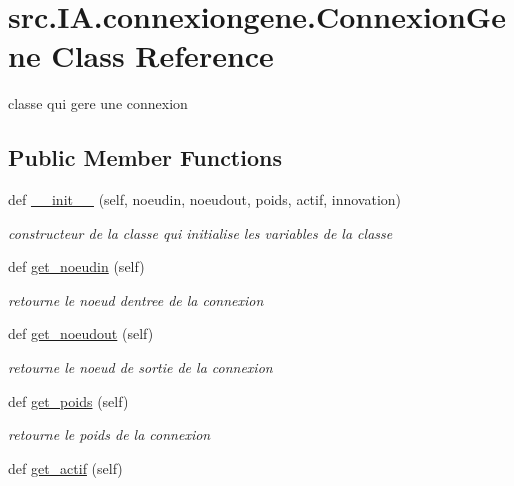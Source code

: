 \hypertarget{classsrc_1_1_i_a_1_1connexiongene_1_1_connexion_gene}{}\section{src.\+I\+A.\+connexiongene.\+Connexion\+Gene Class Reference}
\label{classsrc_1_1_i_a_1_1connexiongene_1_1_connexion_gene}


classe qui gere une connexion  


\subsection*{Public Member Functions}
\begin{DoxyCompactItemize}
\item 
def \hyperlink{classsrc_1_1_i_a_1_1connexiongene_1_1_connexion_gene_a7ec0e67af0142785e0094dee86c51bdd}{\+\_\+\+\_\+init\+\_\+\+\_\+} (self, noeudin, noeudout, poids, actif, innovation)
\begin{DoxyCompactList}\small\item\em constructeur de la classe qui initialise les variables de la classe \end{DoxyCompactList}\item 
def \hyperlink{classsrc_1_1_i_a_1_1connexiongene_1_1_connexion_gene_a9b9157543ead5133573d75d3c2f53058}{get\+\_\+noeudin} (self)
\begin{DoxyCompactList}\small\item\em retourne le noeud d\textquotesingle{}entree de la connexion \end{DoxyCompactList}\item 
def \hyperlink{classsrc_1_1_i_a_1_1connexiongene_1_1_connexion_gene_a4174ac5c3b9ec1eae9c68a03d809672f}{get\+\_\+noeudout} (self)
\begin{DoxyCompactList}\small\item\em retourne le noeud de sortie de la connexion \end{DoxyCompactList}\item 
def \hyperlink{classsrc_1_1_i_a_1_1connexiongene_1_1_connexion_gene_a9f081210b757fa067fd66b08ce09b6f0}{get\+\_\+poids} (self)
\begin{DoxyCompactList}\small\item\em retourne le poids de la connexion \end{DoxyCompactList}\item 
def \hyperlink{classsrc_1_1_i_a_1_1connexiongene_1_1_connexion_gene_a1e2291f5a832ce9132ad7a6c9267d6d6}{get\+\_\+actif} (self)

\end{DoxyCompactItemize}
